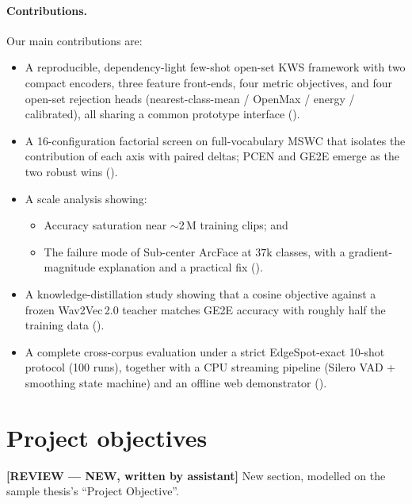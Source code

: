 \documentclass[12pt,a4paper]{report}
\newcommand{\reviewnote}[1]{%
    \par\smallskip\noindent
    \colorbox{yellow!35}{\parbox{0.97\linewidth}{\small\textbf{[REVIEW — NEW, written by assistant]}\; #1}}%
    \par\smallskip}
\newcommand{\reviewnote}[1]{}
\begin{document}
\paragraph{Contributions.} Our main contributions are:
\begin{itemize}[leftmargin=1.4em,itemsep=2pt]
\item A reproducible, dependency-light few-shot open-set KWS framework with two
compact encoders, three feature front-ends, four metric objectives, and four
open-set rejection heads (nearest-class-mean / OpenMax / energy / calibrated),
all sharing a common prototype interface ().
\item A 16-configuration factorial screen on full-vocabulary MSWC that isolates
the contribution of each axis with paired deltas; PCEN and GE2E emerge as the two
robust wins ().
\item A scale analysis showing:
\begin{itemize}[leftmargin=1.3em,itemsep=1pt]
\item Accuracy saturation near $\sim$2\,M training clips; and
\item The failure mode of Sub-center ArcFace at $37$k classes, with a
gradient-magnitude explanation and a practical fix ().
\end{itemize}
\item A knowledge-distillation study showing that a cosine objective against a
frozen Wav2Vec\,2.0 teacher matches GE2E accuracy with roughly half the training
data ().
\item A complete cross-corpus evaluation under a strict EdgeSpot-exact 10-shot
protocol (100 runs), together with a CPU streaming pipeline (Silero VAD +
smoothing state machine) and an offline web demonstrator ().
\end{itemize}

\section{Project objectives}\label{sec:objectives}
\reviewnote{New section, modelled on the sample thesis's ``Project Objective''.}
\end{document}
